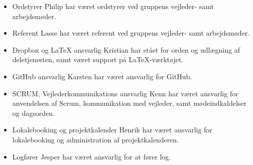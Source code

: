 \begin{itemize}
	\item Ordstyrer \newline
		Philip har været ordstyrer ved gruppens vejleder- samt arbejdsmøder.
	\item Referent \newline
		Lasse har været referent ved gruppens vejleder- samt arbejdsmøder.
	\item Dropbox og LaTeX ansvarlig\newline
		Kristian har stået for orden og udlægning af deletjenesten, samt været support på LaTeX-værktøjet.
	\item GitHub ansvarlig \newline
		Karsten har været ansvarlig for GitHub.
	\item SCRUM, Vejlederkommunikations ansvarlig\newline
		Kenn har været ansvarlig for anvendelsen af Scrum, kommunikation med vejleder, samt mødeindkaldelser og dagsorden.
	\item Lokalebooking og projektkalender\newline
		Henrik har været ansvarlig for lokalebooking og administration af projektkalenderen.
	\item Logfører \newline
		Jesper har været ansvarlig for at fører log.
\end{itemize}
\clearpage